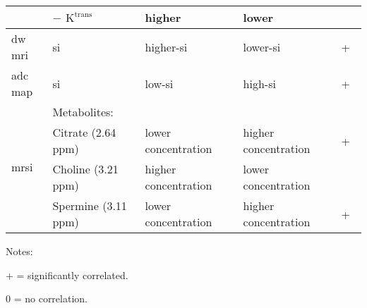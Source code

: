 \begin{table*}
\begin{adjustwidth}{-1.8cm}{}
\begin{threeparttable}
\begin{tabular}{|m{1.7cm}||m{4.5cm}|>{\centering\arraybackslash}m{4.8cm}|>{\centering\arraybackslash}m{4.8cm}|>{\centering\arraybackslash}m{2cm}|}
	& $-$ $\text{K}^{\text{trans}}$ & higher & lower & 0 \\ \hline
	\ac{dw} \ac{mri} & \acs{si} & higher-\ac{si}~\cite{Huisman2003,Barentsz2012} & lower-\ac{si}~\cite{Huisman2003,Barentsz2012} & + \\ \hline
	\acs{adc} map & \acs{si} & low-\ac{si}~\cite{Barentsz2012} & high-\ac{si}~\cite{Barentsz2012} & +~\cite{Hambrock2011, Itou2011, Peng2013} \\ \hline
	\multirow{4}{*}{\ac{mrsi}}& Metabolites: & & & \\[-1.5ex]
	& Citrate (2.64 ppm)~\cite{Verma2010} & lower concentration~\cite{Awwad2012,Costello2006,Graaf2000} & higher concentration~\cite{Awwad2012,Costello2006,Graaf2000} & +~\cite{Giskeodegard2013} \\[-1.5ex]
	& Choline (3.21 ppm)~\cite{Verma2010} & higher concentration~\cite{Awwad2012,Costello2006,Graaf2000} & lower concentration~\cite{Awwad2012,Costello2006,Graaf2000} & 0~\cite{Giskeodegard2013} \\[-1.5ex]
	& Spermine (3.11 ppm)~\cite{Verma2010} & lower concentration~\cite{Awwad2012,Costello2006,Graaf2000} & higher concentration~\cite{Awwad2012,Costello2006,Graaf2000} & +~\cite{Giskeodegard2013} \\ \hline
	
      \end{tabular}
      \begin{tablenotes}
        \small
      \item Notes:
      \item + = significantly correlated.
      \item 0 = no correlation.
      \end{tablenotes}
    \end{threeparttable}
  \end{adjustwidth}
\end{table*}

